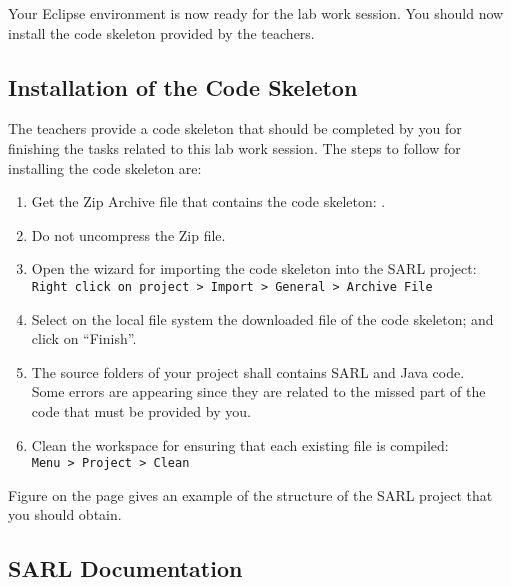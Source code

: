 Your Eclipse environment is now ready for the lab work session.
\ifCODESKELETON
You should now install the code skeleton provided by the teachers.

\subsection{Installation of the Code Skeleton}

The teachers provide a code skeleton that should be completed by you for finishing the tasks related to this lab work session.
The steps to follow for installing the code skeleton are:
\begin{enumerate}
\item Get the Zip Archive file that contains the code skeleton: .
\item Do not uncompress the Zip file.
\item Open the wizard for importing the code skeleton into the SARL project: \\
	\texttt{Right click on project > Import > General > Archive File}
\item Select on the local file system the downloaded file of the code skeleton; and click on ``Finish''.
\item The source folders of your project shall contains SARL and Java code. \\
	Some errors are appearing since they are related to the missed part of the code that must be provided by you. 
\item Clean the workspace for ensuring that each existing file is compiled: \\
	\texttt{Menu > Project > Clean}
\end{enumerate}

Figure  on the page  gives an example of the structure of the SARL project that you should obtain.

\fi

\subsection{SARL Documentation}

